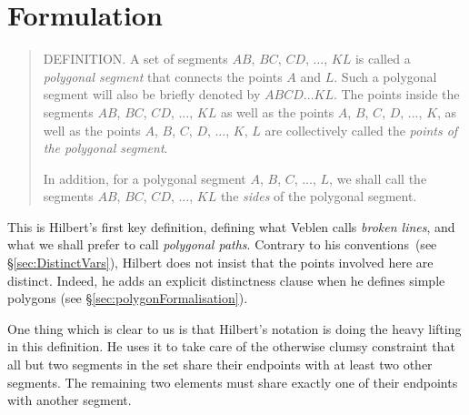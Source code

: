 
\section{Formulation}\label{sec:JordanFormulation}
\begin{quotation}
  DEFINITION. A set of segments $AB$, $BC$, $CD$, $\ldots$, $KL$ is called a \emph{polygonal segment} that connects the points $A$ and $L$. Such a polygonal segment will also be briefly denoted by $ABCD\ldots KL$. The points inside the segments $AB$, $BC$, $CD$, $\ldots$, $KL$ as well as the points $A$, $B$, $C$, $D$, $\ldots$, $K$, as well as the points $A$, $B$, $C$, $D$, $\ldots$, $K$, $L$ are collectively called the \emph{points of the polygonal segment}. 

In addition, for a polygonal segment $A$, $B$, $C$, $\ldots$, $L$, we shall call the segments $AB$, $BC$, $CD$, $\dots$, $KL$ the \emph{sides} of the polygonal segment.
\end{quotation}
This is Hilbert's first key definition, defining what Veblen calls \emph{broken lines}, and what we shall prefer to call \emph{polygonal paths}. Contrary to his conventions~(see \S\ref{sec:DistinctVars}), Hilbert does not insist that the points involved here are distinct. Indeed, he adds an explicit distinctness clause when he defines simple polygons (see \S\ref{sec:polygonFormalisation}).

One thing which is clear to us is that Hilbert's notation is doing the heavy lifting in this definition. He uses it to take care of the otherwise clumsy constraint that all but two segments in the set share their endpoints with at least two other segments. The remaining two elements must share exactly one of their endpoints with another segment.

